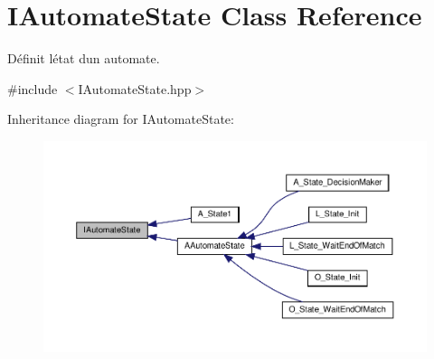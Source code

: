 \hypertarget{classIAutomateState}{}\section{I\+Automate\+State Class Reference}
\label{classIAutomateState}


Définit l\textquotesingle{}état d\textquotesingle{}un automate.  




{\ttfamily \#include $<$I\+Automate\+State.\+hpp$>$}



Inheritance diagram for I\+Automate\+State\+:
\nopagebreak
\begin{figure}[H]
\begin{center}
\leavevmode
\includegraphics[width=350pt]{classIAutomateState__inherit__graph}
\end{center}
\end{figure}
